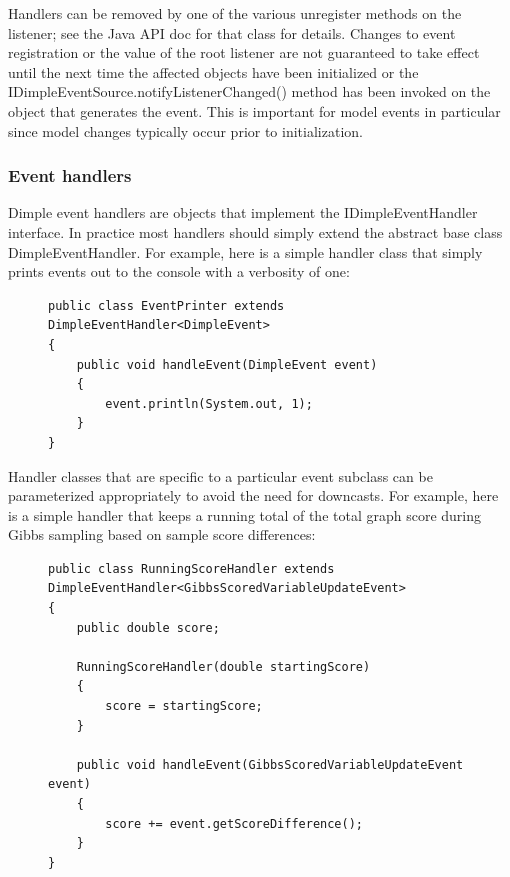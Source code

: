Handlers can be removed by one of the various unregister methods on the listener; see the Java API doc for that class for details. Changes to event registration or the value of the root listener are not guaranteed to take effect until the next time the affected objects have been initialized or the IDimpleEventSource.notifyListenerChanged() method has been invoked on the object that generates the event. This is important for model events in particular since model changes typically occur prior to initialization. 

\subsubsection{Event handlers}
Dimple event handlers are objects that implement the IDimpleEventHandler interface. In practice most handlers should simply extend the abstract base class DimpleEventHandler. For example, here is a simple handler class that simply prints events out to the console with a verbosity of one: 

\begin{figure}[H]
\begin{lstlisting}
public class EventPrinter extends DimpleEventHandler<DimpleEvent>
{
    public void handleEvent(DimpleEvent event)
    {
        event.println(System.out, 1);
    }
}
\end{lstlisting}
\end{figure}

Handler classes that are specific to a particular event subclass can be parameterized appropriately to avoid the need for downcasts. For example, here is a simple handler that keeps a running total of the total graph score during Gibbs sampling based on sample score differences:

\begin{figure}[H] 
\begin{lstlisting}
public class RunningScoreHandler extends DimpleEventHandler<GibbsScoredVariableUpdateEvent>
{
    public double score;

    RunningScoreHandler(double startingScore)
    {
        score = startingScore;
    }

    public void handleEvent(GibbsScoredVariableUpdateEvent event)
    {
        score += event.getScoreDifference();
    }
}
\end{lstlisting}
\end{figure}

\fi